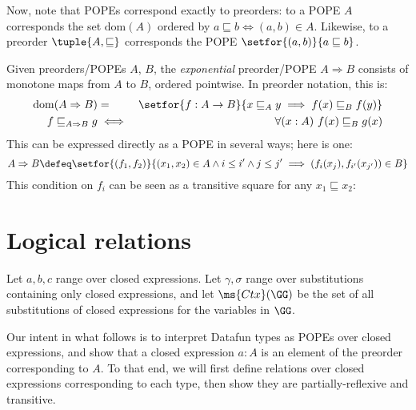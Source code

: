\documentclass{article}
\newcommand{\ale}{\sqsubseteq}
\newcommand{\dom}[1]{\mathrm{dom}(#1)}
\newcommand{\expope}[2]{#1 \Rightarrow #2}
\newcommand{\ALER}{\arrow[no line]{r}{\rotatebox[origin=c]{0}{\scalebox{1.33}{$\ale$}}}}
\newcommand{\ALED}{\arrow[no line]{d}{\rotatebox[origin=c]{-90}{\scalebox{1.33}{$\ale$}}}}
\begin{document}
Now, note that POPEs correspond exactly to preorders: to a POPE $A$ corresponds
the set $\dom{A}$ ordered by $a \ale b \iff (a,b) \in A$. Likewise, to a
preorder $\tuple{A,\ale}$ corresponds the POPE $\setfor{(a,b)}{a \ale b}$.

\begin{definition}
  Given preorders/POPEs $A$, $B$, the \emph{exponential} preorder/POPE
  $\expope{A}{B}$ consists of monotone maps from $A$ to $B$, ordered pointwise.
  In preorder notation, this is:
  \begin{eqnarray*}
    \dom{\expope{A}{B}} &=& \setfor{f : A \to B}
        {x \ale_A y \implies f(x) \ale_B f(y)}\\
    f \ale_{\expope{A}{B}} g &\iff& \forall(x : A)\ f(x) \ale_B g(x)
  \end{eqnarray*}
  This can be expressed directly as a POPE in several ways; here is one:
  \begin{equation*}
    \expope{A}{B} \defeq
    \setfor{(f_1,f_2)}
           {(x_1, x_2) \in A \wedge i \le i' \wedge j \le j'
             \implies (f_i(x_j), f_{i'}(x_{j'})) \in B}
  \end{equation*}
  This condition on $f_i$ can be seen as a transitive square for any $x_1 \ale
  x_2$:
  \begin{center}
            {}
  \end{center}
\end{definition}


\section{Logical relations}

Let $a,b,c$ range over closed expressions. Let $\gamma, \sigma$ range over
substitutions containing only closed expressions, and let $\ms{Ctx}(\GG)$ be the
set of all substitutions of closed expressions for the variables in $\GG$.

Our intent in what follows is to interpret Datafun types as POPEs over closed
expressions, and show that a closed expression $a : A$ is an element of the
preorder corresponding to $A$. To that end, we will first define relations over
closed expressions corresponding to each type, then show they are
partially-reflexive and transitive.
\end{document}
